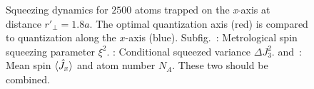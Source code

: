 \documentclass[preprint,aps,pra,onecolumn]{revtex4-1} %
\newcommand{\varz}{\Delta J_3^2}
\newcommand{\comment}[1]{{\color{Maroon} #1}}
\begin{document}
\begin{figure}
\begin{minipage}{.49\linewidth}
\centering
{}
\end{minipage}
\begin{minipage}{.49\linewidth}
\centering
{}
\end{minipage}
\caption{Squeezing dynamics for $2500$ atoms trapped on the \emph{x}-axis at distance $ r'\!_\perp=1.8a$. The optimal quantization axis (red) is compared to quantization along the $x$-axis (blue). 
Subfig.~\protect{}: Metrological spin squeezing parameter $\xi^{2}$. 
\protect{}: Conditional squeezed variance $\varz$. 
\protect{} and~\protect{}: Mean spin $\langle{\hat{J}_x}\rangle$ and atom number $N_A$. \comment{These two should be combined.} }\label{Fig::Squeezing_Dynamics}
\end{figure}
\end{document}
